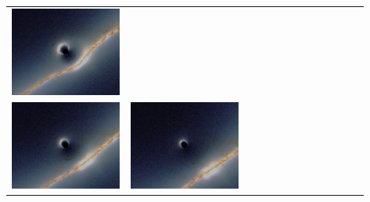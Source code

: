 \documentclass[compress]{beamer}
\begin{document}
\begin{frame}
\begin{tabular}{p{0.3\linewidth} p{0.3\linewidth} p{0.3\linewidth}}
\includegraphics[width=\linewidth]{pictures/black_hole_lensing6.png} \\
\includegraphics[width=\linewidth]{pictures/black_hole_lensing7.png} &
\includegraphics[width=\linewidth]{pictures/black_hole_lensing8.png} &

\end{tabular}
\end{frame}
\end{document}
